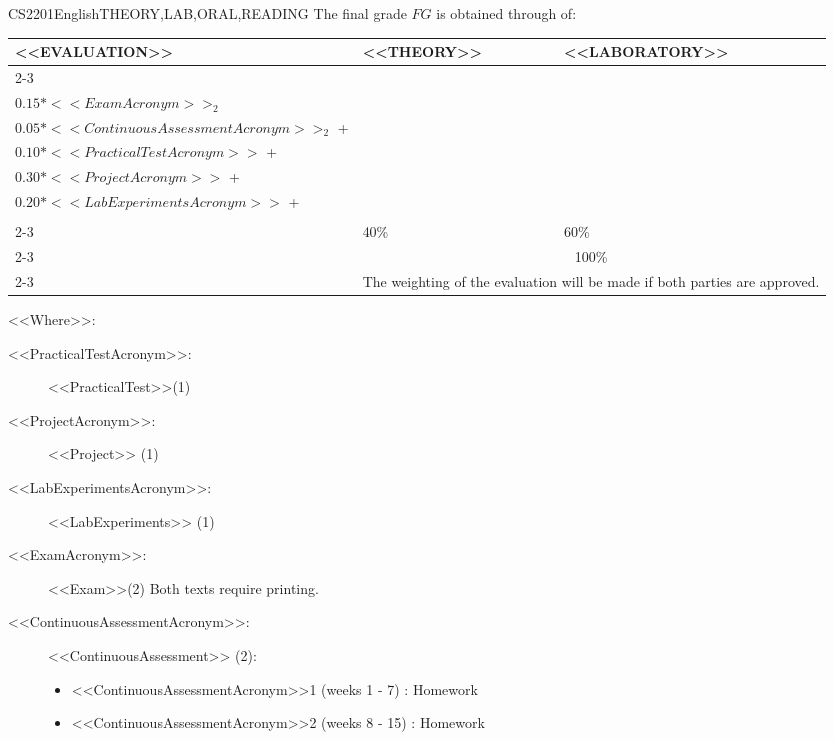   \begin{evaluation}{CS2201}{English}{THEORY,LAB,ORAL,READING}
  The final grade $FG$ is obtained through of:
 
  \begin{tabularx}{0.9\textwidth}{|X|p{}|p{}|} \hline
  \multirow{4}{*}{\uppercase{<<Evaluation>>}} & \uppercase{<<Theory>>} & \uppercase{<<Laboratory>>} \\ \cline{2-3}
  & %
      \begin{minipage}{0.95\textwidth}
      \begin{tabular}{l}
          $0.15*<<ExamAcronym>>_{1}$ + \\
          $0.15*<<ExamAcronym>>_{2}$
          \end{tabular} 
      \end{minipage} 
  & %
      \begin{minipage}{0.95\textwidth}
      \begin{tabular}{l}
          $0.05*<<ContinuousAssessmentAcronym>>_{1}$ + \\
          $0.05*<<ContinuousAssessmentAcronym>>_{2}$ + \\
          $0.10*<<PracticalTestAcronym>>$ + \\
          $0.30*<<ProjectAcronym>>$ + \\
          $0.20*<<LabExperimentsAcronym>>$ + \\
      \end{tabular} 
      \end{minipage}                 \\ \cline{2-3}
  & %
  40\% 
  & %
  60\% \\ \cline{2-3}
  & \multicolumn{2}{|c|}{100\%}  \\ \cline{2-3}
  & \multicolumn{2}{|c|}{The weighting of the evaluation will be made if both parties are approved.}  \\ \hline
  \end{tabularx}
    
  \vspace{2mm}
  \noindent <<Where>>:
  \begin{description}
    \item[<<PracticalTestAcronym>>:] <<PracticalTest>>(1)
    \item[<<ProjectAcronym>>:]  <<Project>> (1)
    \item[<<LabExperimentsAcronym>>:] <<LabExperiments>> (1)
    \item[<<ExamAcronym>>:] <<Exam>>(2) Both texts require printing.
    \item[<<ContinuousAssessmentAcronym>>:] <<ContinuousAssessment>> (2):
      \begin{itemize}
          \item  <<ContinuousAssessmentAcronym>>1 (weeks 1 - 7) : Homework
          \item <<ContinuousAssessmentAcronym>>2 (weeks 8 - 15) : Homework 
      \end{itemize}
  \end{description}


\end{evaluation}
